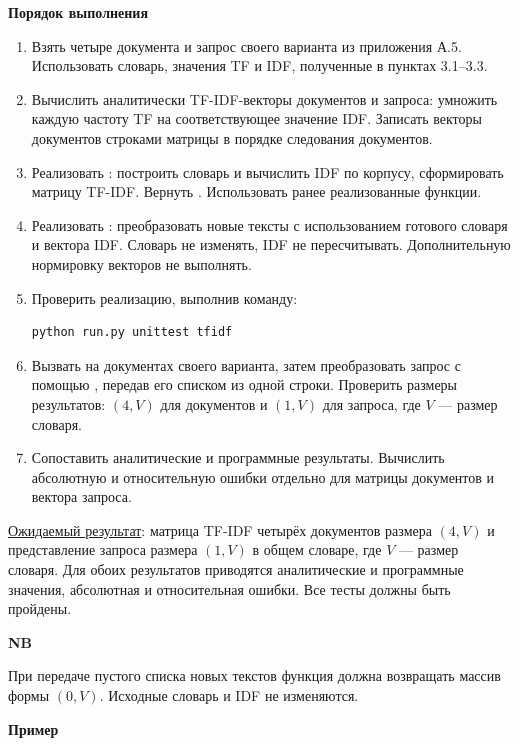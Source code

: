 \documentclass[12pt,a4paper]{article}
\newcommand{\taskhead}[1]{\par\textbf{#1}\par}
\newenvironment{notabene}
  {\par\medskip
   \begin{lrbox}{\nbbox}%
   \begin{minipage}{\dimexpr\linewidth-20pt\relax}
   {\fontsize{13}{16}\selectfont\bfseries
    \color{black!85}NB\par}
   \vspace{4pt}
   \noindent\ignorespaces}
  {\par\end{minipage}%
   \end{lrbox}%
   \noindent
   \begingroup
   \setlength{\fboxsep}{10pt}%
   \colorbox{blue!5}{\usebox{\nbbox}}%
   \endgroup
   \par\medskip}
\begin{document}
\taskhead{Порядок выполнения}
\begin{enumerate}
  \item Взять четыре документа и запрос своего варианта
  из приложения А.5. Использовать словарь, значения TF
  и IDF, полученные в пунктах 3.1--3.3.
  \item Вычислить аналитически TF-IDF-векторы документов
  и запроса: умножить каждую частоту TF
  на соответствующее значение IDF.
  Записать векторы документов строками матрицы
  в порядке следования документов.
  \item Реализовать :
  построить словарь и вычислить IDF по корпусу,
  сформировать матрицу TF-IDF.
  Вернуть .
  Использовать ранее реализованные функции.
  \item Реализовать :
  преобразовать новые тексты с использованием
  готового словаря и вектора IDF.
  Словарь не изменять, IDF не пересчитывать.
  Дополнительную нормировку векторов не выполнять.
  \item Проверить реализацию, выполнив команду:
  \begin{lstlisting}[style=commands]
python run.py unittest tfidf\end{lstlisting}
  \item Вызвать  на документах своего варианта,
  затем преобразовать запрос с помощью
  , передав его списком из одной строки.
  Проверить размеры результатов: $(4,V)$ для документов
  и $(1,V)$ для запроса, где $V$ --- размер словаря.
  \item Сопоставить аналитические и программные результаты.
  Вычислить абсолютную и относительную ошибки отдельно
  для матрицы документов и вектора запроса.
\end{enumerate}

\underline{Ожидаемый результат}: матрица TF-IDF четырёх
документов размера $(4,V)$ и представление запроса
размера $(1,V)$ в общем словаре, где $V$ --- размер словаря.
Для обоих результатов приводятся аналитические
и программные значения, абсолютная и относительная
ошибки. Все тесты должны быть пройдены.

\begin{notabene}
При передаче пустого списка новых текстов функция
 должна возвращать массив
формы $(0,V)$. Исходные словарь и IDF не изменяются.
\end{notabene}

\taskhead{Пример}
\end{document}
